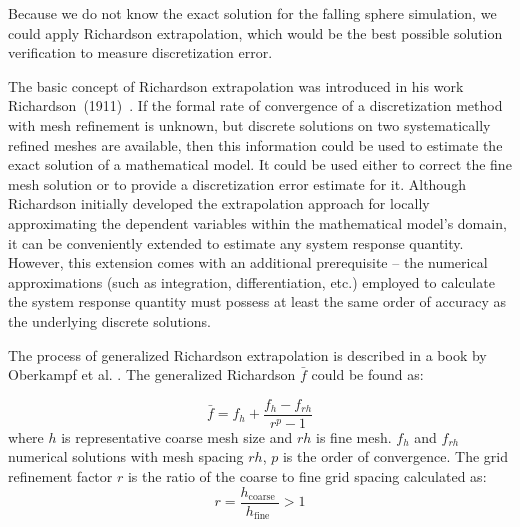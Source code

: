 Because we do not know the exact solution for the falling sphere simulation, we could apply Richardson extrapolation, which would be the best possible solution verification to measure discretization error.

The basic concept of  Richardson extrapolation was introduced in his work Richardson~(1911)~\cite{richardson1911}. If the formal rate of convergence of a discretization method with mesh refinement is unknown, but discrete solutions on two systematically refined meshes are available, then this information could be used to estimate the exact solution of a mathematical model. It could be used either to correct the fine mesh solution or to provide a discretization error estimate for it. Although Richardson initially developed the extrapolation approach for locally approximating the dependent variables within the mathematical model's domain, it can be conveniently extended to estimate any system response quantity. However, this extension comes with an additional prerequisite – the numerical approximations (such as integration, differentiation, etc.) employed to calculate the system response quantity must possess at least the same order of accuracy as the underlying discrete solutions.

The process of generalized Richardson extrapolation is described in a book by Oberkampf et al. \cite{oberkampf}. The generalized Richardson $\bar{f}$ could be found as:

\begin{equation}
\bar{f}=f_h+\frac{f_h-f_{r h}}{r^p-1}
\end{equation}
where $h$ is representative coarse mesh size and $rh$ is fine mesh. $f_h$ and $f_{rh}$ numerical solutions with mesh spacing $rh$, $p$ is the order of convergence. The grid refinement factor $r$ is the ratio of the coarse to fine grid spacing calculated as:
\begin{equation}
r=\frac{h_{\text {coarse }}}{h_{\text {fine }}}>1
\end{equation}


